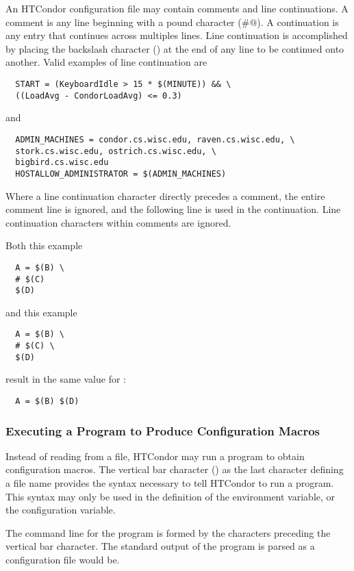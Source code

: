 An HTCondor configuration file may contain comments and
line continuations.
A comment is any line beginning with a pound character (\verb@#@).
A continuation is any entry that continues across multiples lines.
Line continuation is accomplished by placing the backslash
character (\Bs) at the end of any line to be continued onto another.
Valid examples of line continuation are
\begin{verbatim}
  START = (KeyboardIdle > 15 * $(MINUTE)) && \
  ((LoadAvg - CondorLoadAvg) <= 0.3)
\end{verbatim}
and
\begin{verbatim}
  ADMIN_MACHINES = condor.cs.wisc.edu, raven.cs.wisc.edu, \
  stork.cs.wisc.edu, ostrich.cs.wisc.edu, \
  bigbird.cs.wisc.edu
  HOSTALLOW_ADMINISTRATOR = $(ADMIN_MACHINES)
\end{verbatim}

Where a line continuation character directly precedes a comment,
the entire comment line is ignored,
and the following line is used in the continuation. 
Line continuation characters within comments are ignored.

Both this example
\begin{verbatim}
  A = $(B) \
  # $(C)
  $(D)
\end{verbatim}
and this example
\begin{verbatim}
  A = $(B) \
  # $(C) \
  $(D)
\end{verbatim}
result in the same value for \verb@A@:
\begin{verbatim}
  A = $(B) $(D)
\end{verbatim}

\subsubsection{\label{sec:Program-Defined-Macros}Executing a Program to Produce Configuration Macros}

Instead of reading from a file,
HTCondor may run a program to obtain configuration macros.
The vertical bar character (\Bar) as the last character defining
a file name provides the syntax necessary to tell 
HTCondor to run a program.
This syntax may only be used in the definition of
the \Env{CONDOR\_CONFIG} environment variable,
or the \Macro{LOCAL\_CONFIG\_FILE} configuration variable.

The command line for the program 
is formed by the characters preceding the vertical bar character.
The standard output of the program is parsed as a configuration 
file would be.

